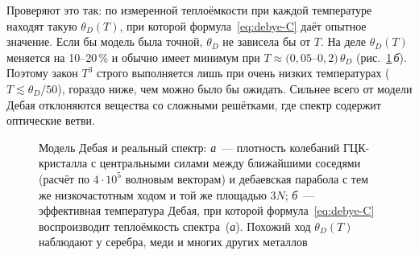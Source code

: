 Проверяют это так: по измеренной теплоёмкости при каждой температуре
находят такую $\theta_D(T)$, при которой формула~\eqref{eq:debye-C} даёт
опытное значение. Если бы модель была точной, $\theta_D$ не зависела бы от
$T$. На деле $\theta_D(T)$ меняется на 10--20\,\% и обычно имеет минимум при
$T\approx(0{,}05$--$0{,}2)\,\theta_D$ (рис.~\ref{fig:dos-real}\,\textit{б}).
Поэтому закон $T^3$ строго выполняется лишь при очень низких температурах
($T\lesssim\theta_D/50$), гораздо ниже, чем можно было бы ожидать. Сильнее
всего от модели Дебая отклоняются вещества со сложными решётками, где
спектр содержит оптические ветви.

\begin{figure}[ht]
\centering
\begin{subfigure}[b]{0.49\textwidth}\centering
{}
\caption{}
\end{subfigure}\hfill
\begin{subfigure}[b]{0.49\textwidth}\centering
{}
\caption{}
\end{subfigure}
\caption{Модель Дебая и реальный спектр: \textit{а}~— плотность колебаний
ГЦК-кристалла с центральными силами между ближайшими соседями (расчёт по
$4\cdot10^5$ волновым векторам) и дебаевская парабола с тем же
низкочастотным ходом и той же площадью $3N$; \textit{б}~— эффективная
температура Дебая, при которой формула~\eqref{eq:debye-C} воспроизводит
теплоёмкость спектра~(\textit{а}). Похожий ход $\theta_D(T)$ наблюдают у
серебра, меди и многих других металлов}
\label{fig:dos-real}
\end{figure}

